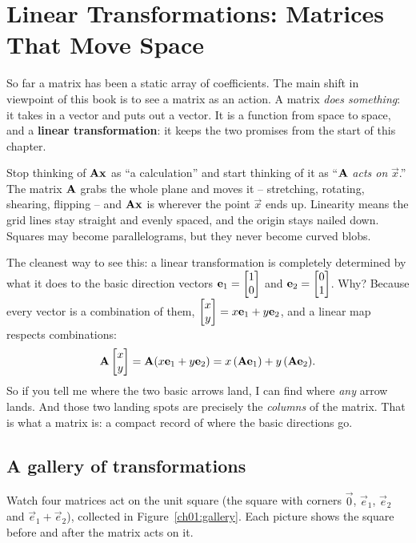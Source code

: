 \section{Linear Transformations: Matrices That Move Space}

So far a matrix has been a static array of coefficients. The main shift in viewpoint of this
book is to see a matrix as an action. A matrix
\emph{does something}: it takes in a vector and puts out a vector. It is a function from space to
space, and a \textbf{linear transformation}: it keeps the two promises from the start of this chapter.

\begin{intuitionbox}
Stop thinking of $\mathbf{A}\mathbf{x}$ as ``a calculation'' and start thinking of it as ``$\mathbf{A}$ \emph{acts
on} $\vec x$.'' The matrix $\mathbf{A}$ grabs the whole plane and moves it -- stretching, rotating,
shearing, flipping -- and $\mathbf{A}\mathbf{x}$ is wherever the point $\vec x$ ends up. Linearity means the
grid lines stay straight and evenly spaced, and the origin stays nailed down. Squares may become
parallelograms, but they never become curved blobs.
\end{intuitionbox}

The cleanest way to see this: a linear transformation is completely determined by what it does
to the basic direction vectors $\mathbf{e}_1 = \begin{bmatrix}1\\0\end{bmatrix}$ and $\mathbf{e}_2 = \begin{bmatrix}0\\1\end{bmatrix}$. Why?
Because every vector is a combination of them, $\begin{bmatrix}x\\y\end{bmatrix} = x\mathbf{e}_1 + y\mathbf{e}_2$, and a linear
map respects combinations:
\[
\mathbf{A}\begin{bmatrix}x\\y\end{bmatrix} = \mathbf{A}(x\mathbf{e}_1 + y\mathbf{e}_2) = x\,(\mathbf{A}\mathbf{e}_1) + y\,(\mathbf{A}\mathbf{e}_2).
\]
So if you tell me where the two basic arrows land, I can find where \emph{any} arrow lands. And those
two landing spots are precisely the \emph{columns} of the matrix. That is what a matrix is: a
compact record of where the basic directions go.

\subsection{A gallery of transformations}

Watch four matrices act on the unit square (the square with corners $\vec 0$, $\vec e_1$, $\vec e_2$
and $\vec e_1+\vec e_2$), collected in Figure~\ref{ch01:gallery}. Each picture shows the square before
and after the matrix acts on it.

